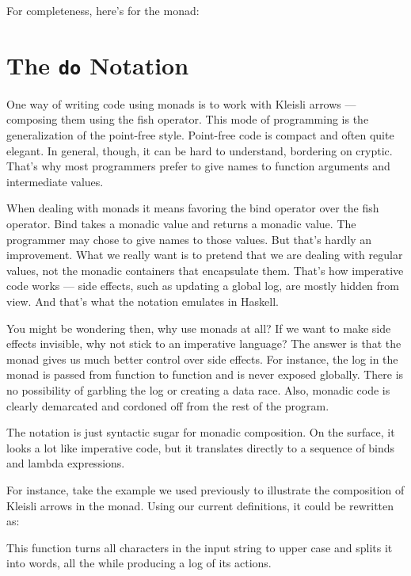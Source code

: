 For completeness, here's  for the  monad:


\section{The \texttt{do} Notation}

One way of writing code using monads is to work with Kleisli arrows ---
composing them using the fish operator. This mode of programming is the
generalization of the point-free style. Point-free code is compact and
often quite elegant. In general, though, it can be hard to understand,
bordering on cryptic. That's why most programmers prefer to give names
to function arguments and intermediate values.

When dealing with monads it means favoring the bind operator over the
fish operator. Bind takes a monadic value and returns a monadic value.
The programmer may chose to give names to those values. But that's
hardly an improvement. What we really want is to pretend that we are
dealing with regular values, not the monadic containers that encapsulate
them. That's how imperative code works --- side effects, such as
updating a global log, are mostly hidden from view. And that's what the
 notation emulates in Haskell.

You might be wondering then, why use monads at all? If we want to make
side effects invisible, why not stick to an imperative language? The
answer is that the monad gives us much better control over side effects.
For instance, the log in the  monad is passed from
function to function and is never exposed globally. There is no
possibility of garbling the log or creating a data race. Also, monadic
code is clearly demarcated and cordoned off from the rest of the
program.

The  notation is just syntactic sugar for monadic
composition. On the surface, it looks a lot like imperative code, but it
translates directly to a sequence of binds and lambda expressions.

For instance, take the example we used previously to illustrate the
composition of Kleisli arrows in the  monad. Using our
current definitions, it could be rewritten as:

This function turns all characters in the input string to upper case and
splits it into words, all the while producing a log of its actions.

